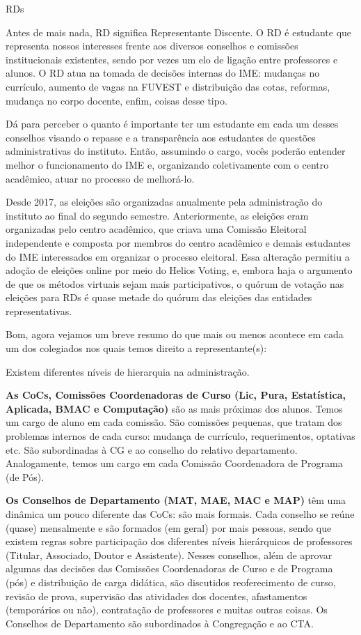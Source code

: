 \begin{subsecao}{RDs}

Antes de mais nada, RD significa Representante Discente. O RD é estudante 
que representa nossos interesses frente aos diversos conselhos e comissões 
institucionais existentes, sendo por vezes um elo de ligação entre professores 
e alunos. O RD atua na tomada de decisões internas do IME: mudanças no currículo, 
aumento de vagas na FUVEST e distribuição das cotas, reformas, mudança no corpo 
docente, enfim, coisas desse tipo.

Dá para perceber o quanto é importante ter um estudante em cada um desses conselhos 
visando o repasse e a transparência aos estudantes de questões administrativas do 
instituto. Então, assumindo o cargo, vocês poderão entender melhor o funcionamento 
do IME e, organizando coletivamente com o centro acadêmico, atuar no processo de melhorá-lo.

Desde 2017, as eleições são organizadas anualmente pela administração do instituto 
ao final do segundo semestre. Anteriormente, as eleições eram organizadas pelo centro 
acadêmico, que criava uma Comissão Eleitoral independente e composta por membros do 
centro acadêmico e demais estudantes do IME interessados em organizar o processo eleitoral. 
Essa alteração permitiu a adoção de eleições online por meio do Helios Voting, e, embora 
haja o argumento de que os métodos virtuais sejam mais participativos, o quórum de votação 
nas eleições para RDs é quase metade do quórum das eleições das entidades representativas.

Bom, agora vejamos um breve resumo do que mais ou menos acontece em cada um dos 
colegiados nos quais temos direito a representante(s):

Existem diferentes níveis de hierarquia na administração.

{\bf As CoCs,
Comissões Coordenadoras de Curso (Lic, Pura, Estatística, Aplicada, BMAC e
Computação)} são as mais próximas dos alunos. Temos um cargo de aluno em cada
comissão. São comissões pequenas, que tratam dos problemas internos de cada
curso: mudança de currículo, requerimentos, optativas etc. São subordinadas
à CG e ao conselho do relativo departamento. Analogamente, temos um cargo em cada
Comissão Coordenadora de Programa (de Pós).

{\bf Os Conselhos de Departamento (MAT, MAE, MAC e MAP)} têm uma dinâmica um
pouco diferente das CoCs: são mais formais. Cada conselho se reúne (quase)
mensalmente e são formados (em geral) por mais pessoas, sendo que existem
regras sobre participação dos diferentes níveis hierárquicos de
professores (Titular, Associado, Doutor e Assistente). Nesses conselhos, além
de aprovar algumas das decisões das Comissões Coordenadoras de Curso e de
Programa (pós) e distribuição de carga didática, são discutidos reoferecimento
de curso, revisão de prova, supervisão das atividades dos docentes,
afastamentos (temporários ou não), contratação de professores e muitas outras
coisas.
Os Conselhos de Departamento são subordinados à Congregação e ao CTA.


\end{subsecao}
